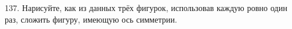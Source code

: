137. Нарисуйте, как из данных трёх фигурок, использовав каждую ровно один раз, сложить фигуру, имеющую ось симметрии.
\begin{center}
\begin{figure}[ht!]
\end{figure}
\end{center}

